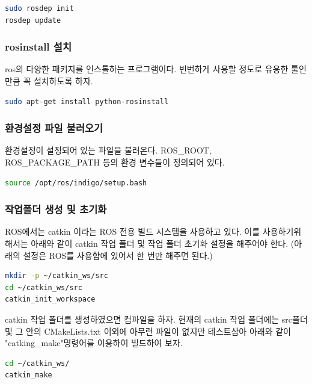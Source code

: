 \begin{lstlisting}[language=bash]
sudo rosdep init
rosdep update
\end{lstlisting}

\subsubsection{rosinstall 설치}
ros의 다양한 패키지를 인스톨하는 프로그램이다. 빈번하게 사용할 정도로 유용한 툴인만큼 꼭 설치하도록 하자. 

\begin{lstlisting}[language=bash]
sudo apt-get install python-rosinstall
\end{lstlisting}

\subsubsection{환경설정 파일 불러오기}
환경설정이 설정되어 있는 파일을 불러온다. ROS\_ROOT, ROS\_PACKAGE\_PATH 등의 환경 변수들이 정의되어 있다.

\begin{lstlisting}[language=bash]
source /opt/ros/indigo/setup.bash
\end{lstlisting}

\subsubsection{작업폴더 생성 및 초기화}
ROS에서는 catkin 이라는 ROS 전용 빌드 시스템을 사용하고 있다. 이를 사용하기위해서는 아래와 같이 catkin 작업 폴더 및 작업 폴더 초기화 설정을 해주어야 한다. (아래의 설정은 ROS를 사용함에 있어서 한 번만 해주면 된다.)

\begin{lstlisting}[language=bash]
mkdir -p ~/catkin_ws/src
cd ~/catkin_ws/src
catkin_init_workspace
\end{lstlisting}

catkin 작업 폴더를 생성하였으면 컴파일을 하자. 현재의 catkin 작업 폴더에는 src폴더 및 그 안의 CMakeLists.txt 이외에 아무런 파일이 없지만 테스트삼아 아래와 같이 "catking\_make"명령어를 이용하여 빌드하여 보자. 

\begin{lstlisting}[language=bash]
cd ~/catkin_ws/
catkin_make
\end{lstlisting}

